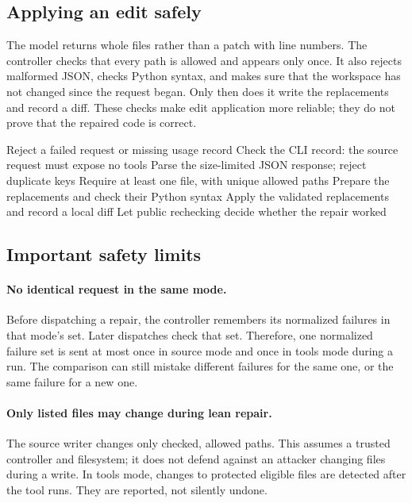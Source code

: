 \documentclass[10pt,twocolumn,a4paper]{article}
\begin{document}
\subsection{Applying an edit safely}
The model returns whole files rather than a patch with line numbers.
The controller checks that every path is allowed and appears only once.
It also rejects malformed JSON, checks Python syntax, and makes sure that
the workspace has not changed since the request began. Only then does it
write the replacements and record a diff. These checks make edit application
more reliable; they do not prove that the repaired code is correct.

\begin{algorithm}[t]
\small
\caption{Validate a source proposal}
\label{alg:apply}
Reject a failed request or missing usage record\;
Check the CLI record: the source request must expose no tools\;
Parse the size-limited JSON response; reject duplicate keys\;
Require at least one file, with unique allowed paths\;
Prepare the replacements and check their Python syntax\;
Apply the validated replacements and record a local diff\;
Let public rechecking decide whether the repair worked\;
\end{algorithm}

\subsection{Important safety limits}
\paragraph{No identical request in the same mode.}
Before dispatching a repair, the controller remembers its normalized
failures in that mode's set. Later dispatches check that set. Therefore,
one normalized failure set is sent at most once in source mode and once in
tools mode during a run. The comparison can still mistake different failures
for the same one, or the same failure for a new one.

\paragraph{Only listed files may change during lean repair.}
The source writer changes only checked, allowed paths. This assumes a trusted
controller and filesystem; it does not defend against an attacker changing
files during a write. In tools mode, changes to protected eligible files are
detected after the tool runs. They are reported, not silently undone.
\end{document}
